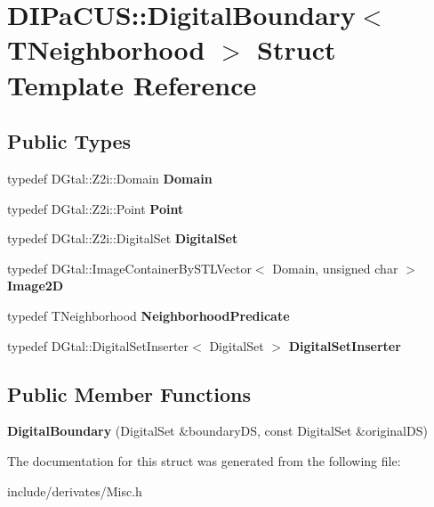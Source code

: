 \hypertarget{structDIPaCUS_1_1DigitalBoundary}{}\section{D\+I\+Pa\+C\+US\+:\+:Digital\+Boundary$<$ T\+Neighborhood $>$ Struct Template Reference}
\label{structDIPaCUS_1_1DigitalBoundary}
\subsection*{Public Types}
\begin{DoxyCompactItemize}
\item 
\mbox{\label{structDIPaCUS_1_1DigitalBoundary_aa901942def85aab85ec62a5a8ce0c92b}} 
typedef D\+Gtal\+::\+Z2i\+::\+Domain {\bfseries Domain}
\item 
\mbox{\label{structDIPaCUS_1_1DigitalBoundary_aaad5f56e508991ae1fae9a5159f69d13}} 
typedef D\+Gtal\+::\+Z2i\+::\+Point {\bfseries Point}
\item 
\mbox{\label{structDIPaCUS_1_1DigitalBoundary_afc9d4e5da090328f38dd3707e2a114d4}} 
typedef D\+Gtal\+::\+Z2i\+::\+Digital\+Set {\bfseries Digital\+Set}
\item 
\mbox{\label{structDIPaCUS_1_1DigitalBoundary_a5a688ac2b0966665ac23911fdaa95c19}} 
typedef D\+Gtal\+::\+Image\+Container\+By\+S\+T\+L\+Vector$<$ Domain, unsigned char $>$ {\bfseries Image2D}
\item 
\mbox{\label{structDIPaCUS_1_1DigitalBoundary_a876cbead5d87c7f6a6d9409ac9c9906d}} 
typedef T\+Neighborhood {\bfseries Neighborhood\+Predicate}
\item 
\mbox{\label{structDIPaCUS_1_1DigitalBoundary_a32f5a8df831a9d3bc0f188c24c6b132c}} 
typedef D\+Gtal\+::\+Digital\+Set\+Inserter$<$ Digital\+Set $>$ {\bfseries Digital\+Set\+Inserter}
\end{DoxyCompactItemize}
\subsection*{Public Member Functions}
\begin{DoxyCompactItemize}
\item 
\mbox{\label{structDIPaCUS_1_1DigitalBoundary_afc5fb55a0c6381e15dedf4113ee11a96}} 
{\bfseries Digital\+Boundary} (Digital\+Set \&boundary\+DS, const Digital\+Set \&original\+DS)
\end{DoxyCompactItemize}


The documentation for this struct was generated from the following file\+:\begin{DoxyCompactItemize}
\item 
include/derivates/Misc.\+h\end{DoxyCompactItemize}

